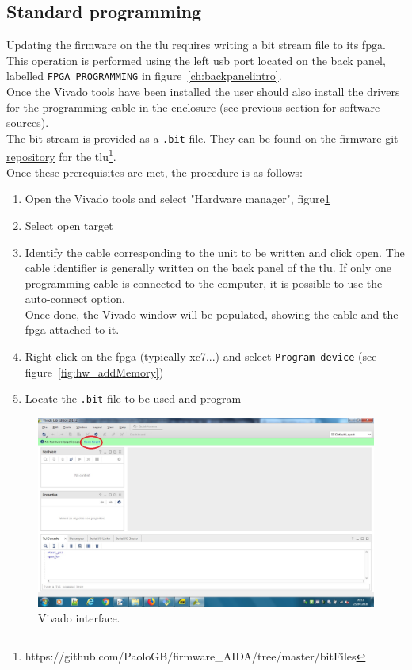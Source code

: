 \subsection{Standard programming}\label{ch:flashFPGA}
Updating the firmware on the \gls{tlu} requires writing a bit stream file to its \gls{fpga}.
This operation is performed using the left \gls{usb} port located on the back panel, labelled \verb"FPGA PROGRAMMING" in figure~\ref{ch:backpanelintro}.\\
Once the Vivado tools have been installed the user should also install the drivers for the programming cable in the enclosure (see previous section for software sources).\\
The bit stream is provided as a \verb".bit" file. They can be found on the firmware \href{https://github.com/PaoloGB/firmware_AIDA/tree/master/bitFiles}{git repository} for the \gls{tlu}\footnote{https://github.com/PaoloGB/firmware\_AIDA/tree/master/bitFiles}.\\
Once these prerequisites are met, the procedure is as follows:
\begin{enumerate}
  \item Open the Vivado tools and select "Hardware manager", figure\ref{fig:hw_open}
  \item Select open target
  \item Identify the cable corresponding to the unit to be written and click open. The cable identifier is generally written on the back panel of the \gls{tlu}. If only one programming cable is connected to the computer, it is possible to use the auto-connect option.\\
      Once done, the Vivado window will be populated, showing the cable and the \gls{fpga} attached to it.  
  \item Right click on the \gls{fpga} (typically xc7...) and select \verb"Program device" (see figure~\ref{fig:hw_addMemory})
  \item Locate the \verb".bit" file to be used and program
  \end{enumerate}
\begin{figure}
  \centering
  \includegraphics[width=.80\textwidth]{./Images/hw_open.jpg}
  \caption{Vivado interface.}\label{fig:hw_open}
\end{figure}
